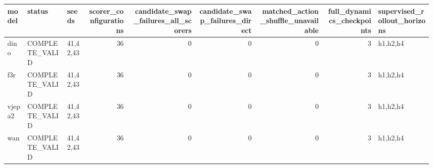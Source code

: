 \begin{tabular}{lllrrrrrl}
\toprule
model & status & seeds & scorer\_configurations & candidate\_swap\_failures\_all\_scorers & candidate\_swap\_failures\_direct & matched\_action\_shuffle\_unavailable & full\_dynamics\_checkpoints & supervised\_rollout\_horizons \\
\midrule
dino & COMPLETE\_VALID & 41,42,43 & 36 & 0 & 0 & 0 & 3 & h1,h2,h4 \\
f3r & COMPLETE\_VALID & 41,42,43 & 36 & 0 & 0 & 0 & 3 & h1,h2,h4 \\
vjepa2 & COMPLETE\_VALID & 41,42,43 & 36 & 0 & 0 & 0 & 3 & h1,h2,h4 \\
wan & COMPLETE\_VALID & 41,42,43 & 36 & 0 & 0 & 0 & 3 & h1,h2,h4 \\
\bottomrule
\end{tabular}
